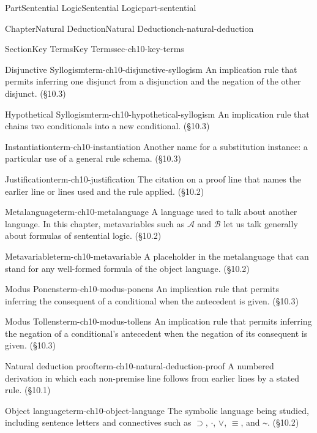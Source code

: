 \documentclass[oneside,10pt,]{book}
\begin{document}
\begin{partptx}{Part}{Sentential Logic}{}{Sentential Logic}{}{}{part-sentential}
\begin{chapterptx}{Chapter}{Natural Deduction}{}{Natural Deduction}{}{}{ch-natural-deduction}
\begin{sectionptx}{Section}{Key Terms}{}{Key Terms}{}{}{sec-ch10-key-terms}
\begin{descriptionlist}
\begin{dlimedium}{Disjunctive Syllogism}{term-ch10-disjunctive-syllogism}
An implication rule that permits inferring one disjunct from a disjunction and the negation of the other disjunct. (§10.3)%
\end{dlimedium}%
\begin{dlimedium}{Hypothetical Syllogism}{term-ch10-hypothetical-syllogism}%
An implication rule that chains two conditionals into a new conditional. (§10.3)%
\end{dlimedium}%
\begin{dlimedium}{Instantiation}{term-ch10-instantiation}%
Another name for a substitution instance: a particular use of a general rule schema. (§10.3)%
\end{dlimedium}%
\begin{dlimedium}{Justification}{term-ch10-justification}%
The citation on a proof line that names the earlier line or lines used and the rule applied. (§10.2)%
\end{dlimedium}%
\begin{dlimedium}{Metalanguage}{term-ch10-metalanguage}%
A language used to talk about another language. In this chapter, metavariables such as \(\mathcal{A}\) and \(\mathcal{B}\) let us talk generally about formulas of sentential logic. (§10.2)%
\end{dlimedium}%
\begin{dlimedium}{Metavariable}{term-ch10-metavariable}%
A placeholder in the metalanguage that can stand for any well-formed formula of the object language. (§10.2)%
\end{dlimedium}%
\begin{dlimedium}{Modus Ponens}{term-ch10-modus-ponens}%
An implication rule that permits inferring the consequent of a conditional when the antecedent is given. (§10.3)%
\end{dlimedium}%
\begin{dlimedium}{Modus Tollens}{term-ch10-modus-tollens}%
An implication rule that permits inferring the negation of a conditional's antecedent when the negation of its consequent is given. (§10.3)%
\end{dlimedium}%
\begin{dlimedium}{Natural deduction proof}{term-ch10-natural-deduction-proof}%
A numbered derivation in which each non-premise line follows from earlier lines by a stated rule. (§10.1)%
\end{dlimedium}%
\begin{dlimedium}{Object language}{term-ch10-object-language}%
The symbolic language being studied, including sentence letters and connectives such as \(\supset\), \(\cdot\), \(\lor\), \(\equiv\), and \({\text{\textasciitilde}}\). (§10.2)%

\end{dlimedium}
\end{descriptionlist}
\end{sectionptx}
\end{chapterptx}
\end{partptx}
\end{document}
